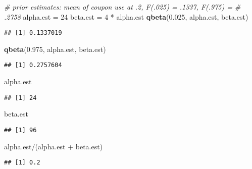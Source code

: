 \documentclass[10pt]{report}
\newenvironment{Shaded}{}{}
\newcommand{\KeywordTok}[1]{\textcolor[rgb]{0.00,0.44,0.13}{\textbf{{#1}}}}
\newcommand{\DecValTok}[1]{\textcolor[rgb]{0.25,0.63,0.44}{{#1}}}
\newcommand{\FloatTok}[1]{\textcolor[rgb]{0.25,0.63,0.44}{{#1}}}
\newcommand{\StringTok}[1]{\textcolor[rgb]{0.25,0.44,0.63}{{#1}}}
\newcommand{\CommentTok}[1]{\textcolor[rgb]{0.38,0.63,0.69}{\textit{{#1}}}}
\newcommand{\NormalTok}[1]{{#1}}
\begin{document}
\begin{Shaded}
\begin{Highlighting}[]
\CommentTok{# prior estimates: mean of coupon use at .2, F(.025) = .1337, F(.975) =}
\CommentTok{# .2758}
\NormalTok{alpha.est =}\StringTok{ }\DecValTok{24}
\NormalTok{beta.est =}\StringTok{ }\DecValTok{4} \NormalTok{*}\StringTok{ }\NormalTok{alpha.est}
\KeywordTok{qbeta}\NormalTok{(}\FloatTok{0.025}\NormalTok{, alpha.est, beta.est)}
\end{Highlighting}
\end{Shaded}

\begin{verbatim}
## [1] 0.1337019
\end{verbatim}

\begin{Shaded}
\begin{Highlighting}[]
\KeywordTok{qbeta}\NormalTok{(}\FloatTok{0.975}\NormalTok{, alpha.est, beta.est)}
\end{Highlighting}
\end{Shaded}

\begin{verbatim}
## [1] 0.2757604
\end{verbatim}

\begin{Shaded}
\begin{Highlighting}[]
\NormalTok{alpha.est}
\end{Highlighting}
\end{Shaded}

\begin{verbatim}
## [1] 24
\end{verbatim}

\begin{Shaded}
\begin{Highlighting}[]
\NormalTok{beta.est}
\end{Highlighting}
\end{Shaded}

\begin{verbatim}
## [1] 96
\end{verbatim}

\begin{Shaded}
\begin{Highlighting}[]
\NormalTok{alpha.est/(alpha.est +}\StringTok{ }\NormalTok{beta.est)}
\end{Highlighting}
\end{Shaded}

\begin{verbatim}
## [1] 0.2
\end{verbatim}
\end{document}
